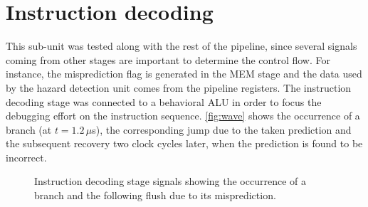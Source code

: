 \section{Instruction decoding}
This sub-unit was tested along with the rest of the pipeline, since several signals coming from other stages are important to determine the control flow. For instance, the misprediction flag is generated in the MEM stage and the data used by the hazard detection unit comes from the pipeline registers. The instruction decoding stage was connected to a behavioral ALU in order to focus the debugging effort on the instruction sequence. \autoref{fig:wave} shows the occurrence of a branch (at $t=1.2\, \mu$s), the corresponding jump due to the taken prediction and the subsequent recovery two clock cycles later, when the prediction is found to be incorrect.

\begin{figure}
	\caption{Instruction decoding stage signals showing the occurrence of a branch and the following flush due to its misprediction.}
	\label{fig:wave}
\end{figure}
